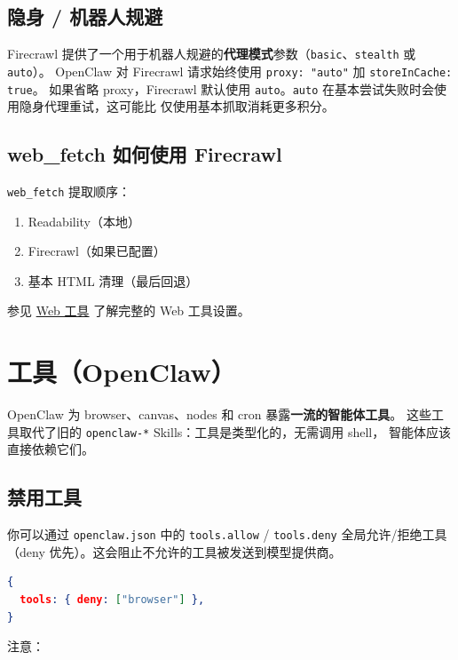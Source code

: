 \subsection{隐身 / 机器人规避}


Firecrawl 提供了一个用于机器人规避的\textbf{代理模式}参数（\texttt{basic}、\texttt{stealth} 或 \texttt{auto}）。
OpenClaw 对 Firecrawl 请求始终使用 \texttt{proxy: "auto"} 加 \texttt{storeInCache: true}。
如果省略 proxy，Firecrawl 默认使用 \texttt{auto}。\texttt{auto} 在基本尝试失败时会使用隐身代理重试，这可能比
仅使用基本抓取消耗更多积分。

\subsection{web\_fetch 如何使用 Firecrawl}


\texttt{web\_fetch} 提取顺序：

\begin{enumerate}
  \item Readability（本地）
  \item Firecrawl（如果已配置）
  \item 基本 HTML 清理（最后回退）
\end{enumerate}


参见 \href{/tools/web}{Web 工具} 了解完整的 Web 工具设置。


\clearpage

\section{工具（OpenClaw）}


OpenClaw 为 browser、canvas、nodes 和 cron 暴露\textbf{一流的智能体工具}。
这些工具取代了旧的 \texttt{openclaw-*} Skills：工具是类型化的，无需调用 shell，
智能体应该直接依赖它们。

\subsection{禁用工具}


你可以通过 \texttt{openclaw.json} 中的 \texttt{tools.allow} / \texttt{tools.deny} 全局允许/拒绝工具
（deny 优先）。这会阻止不允许的工具被发送到模型提供商。

\begin{lstlisting}[language=json]
{
  tools: { deny: ["browser"] },
}
\end{lstlisting}


注意：

